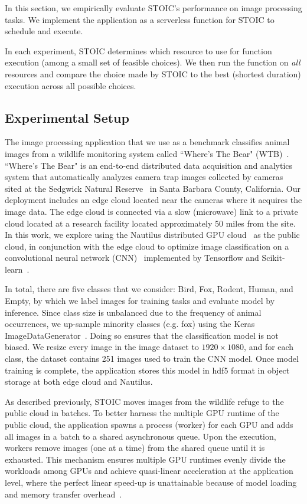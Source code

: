 In this section, we empirically evaluate STOIC's performance on image processing tasks. We implement the application as a serverless function for STOIC to schedule and execute.

In each experiment, STOIC determines which resource to use for function execution (among a small set of feasible choices). We then run the function on \textit{all} resources and compare the choice made by STOIC to the best (shortest duration) execution across all possible choices.

\subsection{Experimental Setup}

The image processing application that we use as a benchmark classifies animal images from a wildlife monitoring system called ``Where's The Bear"
(WTB)~\cite{ref:wtb}. ``Where's The Bear" is an end-to-end distributed data acquisition and analytics system that automatically analyzes camera trap images collected by cameras sited at the Sedgwick Natural Reserve~\cite{ref:sedgwick} in Santa Barbara County, California. Our deployment includes an edge cloud located near the cameras where it acquires the image data. The edge cloud is connected via a slow (microwave) link to a private cloud located at a research facility located approximately 50 miles from the site. In this work, we explore using the Nautilus distributed GPU cloud~\cite{ref:nautilus} as the public cloud, in conjunction with the edge cloud to optimize image classification on a convolutional neural network (CNN)~\cite{ref:cnn} implemented by Tensorflow and Scikit-learn~\cite{ref:scikit}. 

In total, there are five classes that we consider: Bird, Fox, Rodent, Human, and Empty, by which we label images for training tasks and evaluate model by inference. Since class size is unbalanced due to the frequency of animal occurrences, we up-sample minority classes (e.g. fox) using the Keras ImageDataGenerator~\cite{ref:keras}. Doing so ensures that the classification model is not biased. We resize every image in the image dataset to $1920 \times 1080$, and for each class, the dataset contains 251 images used to train the CNN model. Once model training is complete, the application stores this model in hdf5 format in object storage at both edge cloud and Nautilus.

As described previously, STOIC moves images from the wildlife refuge to the public cloud in batches. To better harness the multiple GPU runtime of the public cloud, the application spawns a process (wor\-ker) for each GPU and adds all images in a batch to a shared asynchronous queue. Upon the execution, workers remove images (one at a time) from the shared queue until it is exhausted. This mechanism ensures multiple GPU runtimes evenly divide the workloads among GPUs and achieve quasi-linear acceleration at the application level, where the perfect linear speed-up is unattainable because of model loading and memory transfer overhead~\cite{ref:multi_gpu}. 


